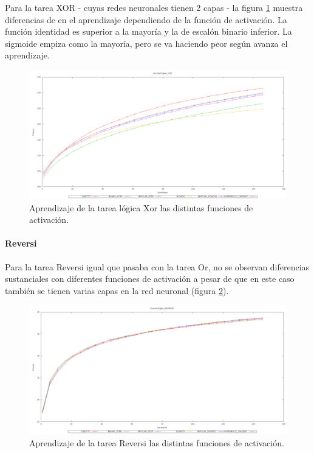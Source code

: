 \documentclass[11pt]{article}
\begin{document}
\begin{titlepage}
Para la tarea XOR - cuyas redes neuronales tienen 2 capas - la figura \ref{aprenFuncXor} muestra diferencias de en el aprendizaje dependiendo de la función de activación. La función identidad es superior a la mayoría y la de escalón binario inferior. La sigmoide empiza como la mayoría, pero se va haciendo peor según avanza el aprendizaje.

\begin{figure}[htb]
\centering
\includegraphics[width=\textwidth]{./img/FunctionTypes_XOR.png}
\caption{\label{aprenFuncXor}Aprendizaje de la tarea lógica Xor las distintas funciones de activación.}
\end{figure}

\newpage
\paragraph{Reversi}
\label{sec-6-2-1-4}


Para la tarea Reversi igual que pasaba con la tarea Or, no se observan diferencias sustanciales con diferentes funciones de activación a pesar de que en este caso también se tienen varias capas en la red neuronal (figura \ref{aprenFuncReversi}).

\begin{figure}[htb]
\centering
\includegraphics[width=\textwidth]{./img/FunctionTypes_REVERSI.png}
\caption{\label{aprenFuncReversi}Aprendizaje de la tarea Reversi las distintas funciones de activación.}
\end{figure}


\end{titlepage}
\end{document}
